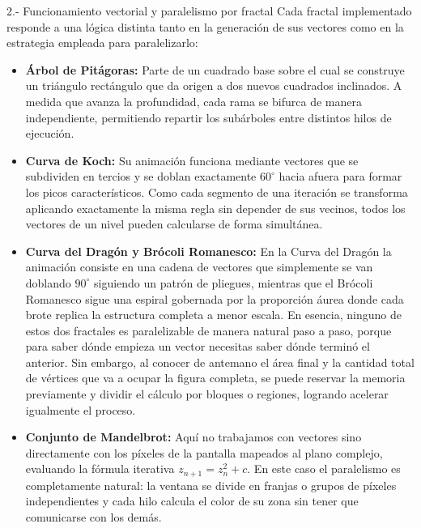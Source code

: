\begin{respuesta}{2.- Funcionamiento vectorial y paralelismo por fractal}
    Cada fractal implementado responde a una lógica distinta tanto en la generación de sus vectores como en la estrategia empleada para paralelizarlo:
    \begin{itemize}
        \item \textbf{Árbol de Pitágoras:} Parte de un cuadrado base sobre el cual se construye un triángulo rectángulo que da origen a dos nuevos cuadrados inclinados. A medida que avanza la profundidad, cada rama se bifurca de manera independiente, permitiendo repartir los subárboles entre distintos hilos de ejecución.
        
        \item \textbf{Curva de Koch:} Su animación funciona mediante vectores que se subdividen en tercios y se doblan exactamente $60^\circ$ hacia afuera para formar los picos característicos. Como cada segmento de una iteración se transforma aplicando exactamente la misma regla sin depender de sus vecinos, todos los vectores de un nivel pueden calcularse de forma simultánea.
        
        \item \textbf{Curva del Dragón y Brócoli Romanesco:} En la Curva del Dragón la animación consiste en una cadena de vectores que simplemente se van doblando $90^\circ$ siguiendo un patrón de pliegues, mientras que el Brócoli Romanesco sigue una espiral gobernada por la proporción áurea donde cada brote replica la estructura completa a menor escala. En esencia, ninguno de estos dos fractales es paralelizable de manera natural paso a paso, porque para saber dónde empieza un vector necesitas saber dónde terminó el anterior. Sin embargo, al conocer de antemano el área final y la cantidad total de vértices que va a ocupar la figura completa, se puede reservar la memoria previamente y dividir el cálculo por bloques o regiones, logrando acelerar igualmente el proceso.
        
        \item \textbf{Conjunto de Mandelbrot:} Aquí no trabajamos con vectores sino directamente con los píxeles de la pantalla mapeados al plano complejo, evaluando la fórmula iterativa $z_{n+1} = z_n^2 + c$. En este caso el paralelismo es completamente natural: la ventana se divide en franjas o grupos de píxeles independientes y cada hilo calcula el color de su zona sin tener que comunicarse con los demás.
    \end{itemize}
\end{respuesta}

